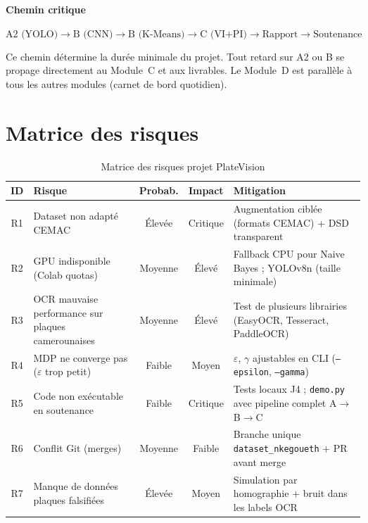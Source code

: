 \documentclass[12pt,a4paper]{article}
\begin{document}
\paragraph{Chemin critique}
\[
\text{A2 (YOLO)} \to \text{B (CNN)} \to \text{B (K-Means)}
\to \text{C (VI+PI)} \to \text{Rapport} \to \text{Soutenance}
\]

Ce chemin d\'{e}termine la dur\'{e}e minimale du projet. Tout retard
sur A2 ou B se propage directement au Module~C et aux livrables.
Le Module~D est parall\`{e}le \`{a} tous les autres modules (carnet de
bord quotidien).

\section{Matrice des risques}
\label{sec:gp:risques}

\begin{table}[H]
\centering
\caption{Matrice des risques projet PlateVision}
\label{tab:gp:risques}
\begin{tabular}{clccp{4.5cm}}
\toprule
\textbf{ID} & \textbf{Risque} & \textbf{Probab.} & \textbf{Impact} & \textbf{Mitigation} \\
\midrule
R1 & Dataset non adapt\'{e} CEMAC
   & \'{E}lev\'{e}e
   & Critique
   & Augmentation cibl\'{e}e (formats CEMAC) + DSD transparent \\
R2 & GPU indisponible (Colab quotas)
   & Moyenne
   & \'{E}lev\'{e}
   & Fallback CPU pour Naive Bayes ; YOLOv8n (taille minimale) \\
R3 & OCR mauvaise performance sur plaques camerounaises
   & Moyenne
   & \'{E}lev\'{e}
   & Test de plusieurs librairies (EasyOCR, Tesseract, PaddleOCR) \\
R4 & MDP ne converge pas ($\varepsilon$ trop petit)
   & Faible
   & Moyen
   & $\varepsilon$, $\gamma$ ajustables en CLI (\texttt{--epsilon}, \texttt{--gamma}) \\
R5 & Code non ex\'{e}cutable en soutenance
   & Faible
   & Critique
   & Tests locaux J4 ; \texttt{demo.py} avec pipeline complet A$\to$B$\to$C \\
R6 & Conflit Git (merges)
   & Moyenne
   & Faible
   & Branche unique \texttt{dataset\_nkegoueth} + PR avant merge \\
R7 & Manque de donn\'{e}es plaques falsifi\'{e}es
   & \'{E}lev\'{e}e
   & Moyen
   & Simulation par homographie + bruit dans les labels OCR \\
\bottomrule
\end{tabular}
\end{table}
\end{document}
